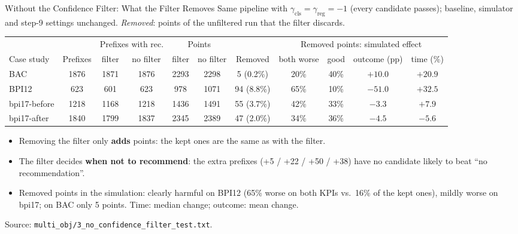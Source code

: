 \documentclass[aspectratio=169]{beamer} %
\begin{document}
\begin{frame}{Without the Confidence Filter: What the Filter Removes}
  \footnotesize
  Same pipeline with $\gamma_{\text{cls}} = \gamma_{\text{reg}} = -1$ (every candidate passes); baseline,
  simulator and step-9 settings unchanged. \emph{Removed}: points of the unfiltered run that the filter discards.
  \begin{center}\scriptsize\setlength{\tabcolsep}{2pt}
  \begin{tabular}{l c cc cc c cccc}
    \toprule
     & & \multicolumn{2}{c}{Prefixes with rec.} & \multicolumn{2}{c}{Points}
     & & \multicolumn{4}{c}{Removed points: simulated effect} \\
    \cmidrule(lr){3-4}\cmidrule(lr){5-6}\cmidrule(lr){8-11}
    Case study & Prefixes & filter & no filter & filter & no filter & Removed
      & both worse & good & outcome (pp) & time (\%) \\
    \midrule
    BAC          & 1876 & 1871 & 1876 & 2293 & 2298 &  5 (0.2\%) & 20\% & 40\% & $+10.0$ & $+20.9$ \\
    BPI12        &  623 &  601 &  623 &  978 & 1071 & 94 (8.8\%) & 65\% & 10\% & $-51.0$ & $+32.5$ \\
    bpi17-before & 1218 & 1168 & 1218 & 1436 & 1491 & 55 (3.7\%) & 42\% & 33\% & $-3.3$  & $+7.9$  \\
    bpi17-after  & 1840 & 1799 & 1837 & 2345 & 2389 & 47 (2.0\%) & 34\% & 36\% & $-4.5$  & $-5.6$  \\
    \bottomrule
  \end{tabular}
  \end{center}
  \scriptsize
  \begin{itemize}
    \item Removing the filter only \textbf{adds} points: the kept ones are the same as with the filter.
    \item The filter decides \textbf{when not to recommend}: the extra prefixes (+5 / +22 / +50 / +38) have no
      candidate likely to beat ``no recommendation''.
    \item Removed points in the simulation: clearly harmful on BPI12 (65\% worse on both KPIs vs.\ 16\% of the kept
      ones), mildly worse on bpi17; on BAC only 5 points. Time: median change; outcome: mean change.
  \end{itemize}
  {\scriptsize Source: \texttt{multi\_obj/3\_no\_confidence\_filter\_test.txt}.}
\end{frame}
\end{document}
